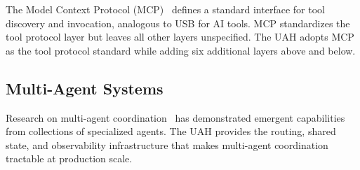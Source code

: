 The Model Context Protocol (MCP)~\cite{mcp2024} defines a standard interface
for tool discovery and invocation, analogous to USB for AI tools. MCP
standardizes the tool protocol layer but leaves all other layers unspecified.
The UAH adopts MCP as the tool protocol standard while adding six additional
layers above and below.

\subsection{Multi-Agent Systems}

Research on multi-agent coordination~\cite{park2023generative,
wu2023autogen} has demonstrated emergent capabilities from collections of
specialized agents. The UAH provides the routing, shared state, and
observability infrastructure that makes multi-agent coordination tractable at
production scale.

